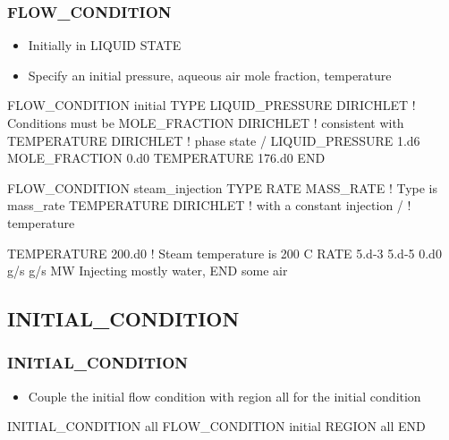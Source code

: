 \documentclass{beamer}
\newcommand\redcomment[1]{{{\color{red} #1}}}
\newcommand\bluecomment[1]{{{\color{blue} #1}}}
\newcommand\greencomment[1]{{{\color{green} #1}}}
\begin{document}
\begin{frame}\frametitle{FLOW\_CONDITION}

\begin{itemize}
\item Initially in \redcomment{LIQUID STATE}
\item Specify an initial pressure, aqueous air mole fraction, temperature
\end{itemize}

\begin{semiverbatim}
FLOW_CONDITION initial 
  TYPE
    LIQUID_PRESSURE DIRICHLET \bluecomment{! Conditions must be}
    MOLE_FRACTION DIRICHLET   \bluecomment{! consistent with}
    TEMPERATURE DIRICHLET     \bluecomment{! phase state}
  /
  LIQUID_PRESSURE 1.d6
  MOLE_FRACTION 0.d0
  TEMPERATURE 176.d0
END                      

\newpage

FLOW_CONDITION steam_injection 
  TYPE
    RATE MASS_RATE         \bluecomment{! Type is \redcomment{mass_rate}}
    TEMPERATURE DIRICHLET  \bluecomment{! with a constant injection}
  /                        \bluecomment{! temperature}

  TEMPERATURE 200.d0       \bluecomment{! Steam temperature is 200 C}     
  RATE 5.d-3 5.d-5 0.d0 g/s g/s MW \bluecomment{Injecting mostly water,}
END                                \bluecomment{some air}
\end{semiverbatim}

\end{frame}

\subsection{INITIAL\_CONDITION}

\begin{frame}[fragile]\frametitle{INITIAL\_CONDITION}

\begin{itemize}
\item Couple the \greencomment{initial} flow condition with region \greencomment{all} for the initial condition
\end{itemize}

\begin{semiverbatim}

INITIAL_CONDITION all 
  FLOW_CONDITION initial
  REGION all
END

\end{semiverbatim}

\end{frame}
\end{document}
